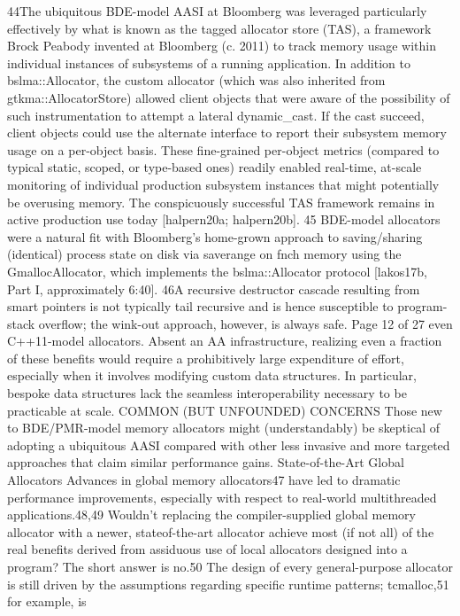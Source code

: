 44The ubiquitous BDE-model AASI at Bloomberg was leveraged particularly effectively by what is
known as the tagged allocator store (TAS), a framework Brock Peabody invented at Bloomberg (c.
2011) to track memory usage within individual instances of subsystems of a running application. In
addition to bslma::Allocator, the custom allocator (which was also inherited from
gtkma::AllocatorStore) allowed client objects that were aware of the possibility of such
instrumentation to attempt a lateral dynamic_cast. If the cast succeed, client objects could use the
alternate interface to report their subsystem memory usage on a per-object basis. These fine-grained
per-object metrics (compared to typical static, scoped, or type-based ones) readily enabled real-time,
at-scale monitoring of individual production subsystem instances that might potentially be overusing
memory. The conspicuously successful TAS framework remains in active production use today
[halpern20a; halpern20b]. 45 BDE-model allocators were a natural fit with Bloomberg’s home-grown approach to saving/sharing
(identical) process state on disk via saverange on fnch memory using the GmallocAllocator, which
implements the bslma::Allocator protocol [lakos17b, Part I, approximately 6:40]. 46A recursive destructor cascade resulting from smart pointers is not typically tail recursive and is
hence susceptible to program-stack overflow; the wink-out approach, however, is always safe.
Page 12 of 27
even C++11-model allocators. Absent an AA infrastructure, realizing even a fraction
of these benefits would require a prohibitively large expenditure of effort, especially
when it involves modifying custom data structures. In particular, bespoke data
structures lack the seamless interoperability necessary to be practicable at scale.
COMMON (BUT UNFOUNDED) CONCERNS
Those new to BDE/PMR-model memory allocators might (understandably) be
skeptical of adopting a ubiquitous AASI compared with other less invasive and more
targeted approaches that claim similar performance gains.
State-of-the-Art Global Allocators
Advances in global memory allocators47 have led to dramatic performance
improvements, especially with respect to real-world multithreaded applications.48,49
Wouldn’t replacing the compiler-supplied global memory allocator with a newer, stateof-the-art allocator achieve most (if not all) of the real benefits derived from assiduous
use of local allocators designed into a program?
The short answer is no.50 The design of every general-purpose allocator is still driven
by the assumptions regarding specific runtime patterns; tcmalloc,51 for example, is
